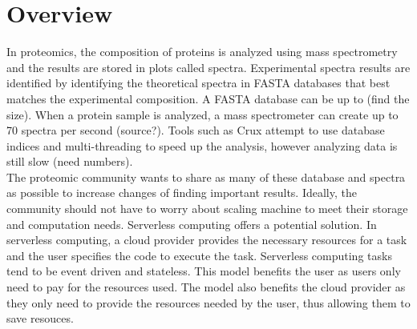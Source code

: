 \newcommand{\LineComment}[1]{\Statex \hfill\textit{#1}}
\vspace{-0.15in}
\section{Overview}
In proteomics, the composition of proteins is analyzed using mass spectrometry and the results are stored in plots called spectra.
Experimental spectra results are identified by identifying the theoretical spectra in FASTA databases that best matches the experimental composition.
A FASTA database can be up to (find the size).
When a protein sample is analyzed, a mass spectrometer can create up to 70 spectra per second (source?).
Tools such as Crux attempt to use database indices and multi-threading to speed up the analysis, however analyzing data is still slow (need numbers)\cite{crux}.\\
\newline
The proteomic community wants to share as many of these database and spectra as possible to increase changes of finding important results.
Ideally, the community should not have to worry about scaling machine to meet their storage and computation needs. Serverless computing offers a potential solution.
In serverless computing, a cloud provider provides the necessary resources for a task and the user specifies the code to execute the task.
Serverless computing tasks tend to be event driven and stateless.
This model benefits the user as users only need to pay for the resources used.
The model also benefits the cloud provider as they only need to provide the resources needed by the user, thus allowing them to save resouces.\\

